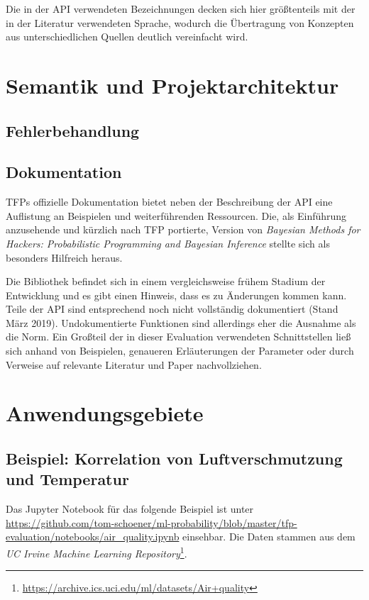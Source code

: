 \documentclass[12pt]{article}
\begin{document}
Die in der API verwendeten Bezeichnungen decken sich hier größtenteils mit der in der Literatur verwendeten Sprache, wodurch die Übertragung von Konzepten aus unterschiedlichen Quellen deutlich vereinfacht wird. 


\section{Semantik und Projektarchitektur}

\subsection{Fehlerbehandlung}

\subsection{Dokumentation}
TFPs offizielle Dokumentation bietet neben der Beschreibung der API eine Auflistung an Beispielen und weiterführenden Ressourcen. Die, als Einführung anzusehende und kürzlich nach TFP portierte, Version von \textit{Bayesian Methods for Hackers: Probabilistic Programming and Bayesian Inference}\cite{Davidson-Pilon2015} stellte sich als besonders Hilfreich heraus.

Die Bibliothek befindet sich in einem vergleichsweise frühem Stadium der Entwicklung und es gibt einen Hinweis, dass es zu Änderungen kommen kann. Teile der API sind entsprechend noch nicht vollständig dokumentiert (Stand März 2019).
Undokumentierte Funktionen sind allerdings eher die Ausnahme als die Norm. Ein Großteil der in dieser Evaluation verwendeten Schnittstellen ließ sich anhand von Beispielen, genaueren Erläuterungen der Parameter oder durch Verweise auf relevante Literatur und Paper nachvollziehen.

\section{Anwendungsgebiete}
\subsection{Beispiel: Korrelation von Luftverschmutzung und Temperatur}
\label{sec:example_air_quality}

Das Jupyter Notebook für das folgende Beispiel ist unter \url{https://github.com/tom-schoener/ml-probability/blob/master/tfp-evaluation/notebooks/air_quality.ipynb} einsehbar. Die Daten stammen aus dem \textit{UC Irvine Machine Learning Repository}\footnote{\url{https://archive.ics.uci.edu/ml/datasets/Air+quality}}.
\end{document}
